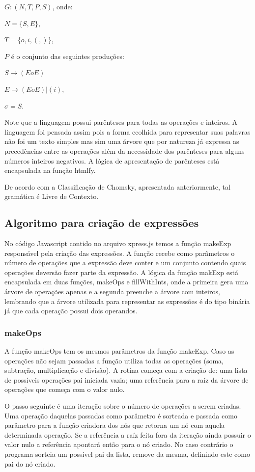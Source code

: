 $G: (N, T, P, S)$, onde:

$N = \{S,E\}$,

$T = \{o,i,(,)\}$,

$P$ é o conjunto das seguintes produções:

$S \to (EoE)$

$E \to (EoE) | (i)$,

$\sigma = S$.

Note que a linguagem possui parênteses para todas as operações e inteiros. A linguagem foi pensada assim pois a forma ecolhida para representar suas palavras não foi um texto simples mas sim uma árvore que por natureza já expressa as precedências entre as operações além da necessidade dos parênteses para alguns números inteiros negativos. A lógica de apresentação de parênteses está encapsulada na função htmlfy.

	De acordo com a Classificação de Chomsky, apresentada anteriormente, tal gramática é Livre de Contexto.
	
\subsection{Algoritmo para criação de expressões}
No código Javascript contido no arquivo xpress.js temos a função makeExp responsável pela criação das expressões. A função recebe como parâmetros o número de operações que a expressão deve conter e um conjunto contendo quais operações deversão fazer parte da expressão. A lógica da função makExp está encapsulada em duas funções, makeOps e fillWithInts, onde a primeira gera uma árvore de operações apenas e a segunda preenche a árvore com inteiros, lembrando que a árvore utilizada para representar as expressões é do tipo binária já que cada operação possui dois operandos.

\subsubsection{makeOps}
A função makeOps tem os mesmos parâmetros da função makeExp. Caso as operações não sejam passadas a função utiliza todas as operações (soma, subtração, multiplicação e divisão). A rotina começa com a criação de: uma lista de possíveis operações pai iniciada vazia; uma referência para a raíz da árvore de operações que começa com o valor nulo.

	O passo seguinte é uma iteração sobre o número de operações a serem criadas. Uma operação daquelas passadas como parâmetro é sorteada e passada como parâmetro para a função criadora dos nós que retorna um nó com aquela determinada operação. Se a referência a raíz feita fora da iteração ainda possuir o valor nulo a referência apontará então para o nó criado. No caso contrário o programa sorteia um possível pai da lista, remove da mesma, definindo este como pai do nó criado. 
	
